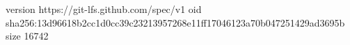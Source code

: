 version https://git-lfs.github.com/spec/v1
oid sha256:13d96618b2cc1d0cc39c23213957268e11ff17046123a70b047251429ad3695b
size 16742
